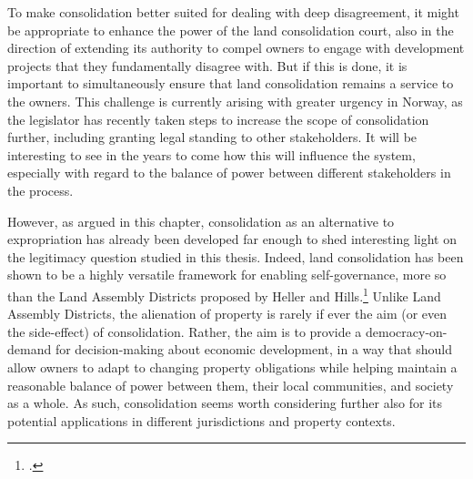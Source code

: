 To make consolidation better suited for dealing with deep disagreement, it might be appropriate to enhance the power of the land consolidation court, also in the direction of extending its authority to compel owners to engage with development projects that they fundamentally disagree with. But if this is done, it is important to simultaneously ensure that land consolidation remains a service to the owners. This challenge is currently arising with greater urgency in Norway, as the legislator has recently taken steps to increase the scope of consolidation further, including granting legal standing to other stakeholders. It will be interesting to see in the years to come how this will influence the system, especially with regard to the balance of power between different stakeholders in the process.

However, as argued in this chapter, consolidation as an alternative to expropriation has already been developed far enough to shed interesting light on the legitimacy question studied in this thesis. Indeed, land consolidation has been shown to be a highly versatile framework for enabling self-governance, more so than the Land Assembly Districts proposed by Heller and Hills.\footcite{heller08} Unlike Land Assembly Districts, the alienation of property is rarely if ever the aim (or even the side-effect) of consolidation. Rather, the aim is to provide a democracy-on-demand for decision-making about economic development, in a way that should allow owners to adapt to changing property obligations while helping maintain a reasonable balance of power between them, their local communities, and society as a whole. As such, consolidation seems worth considering further also for its potential applications in different jurisdictions and property contexts.

